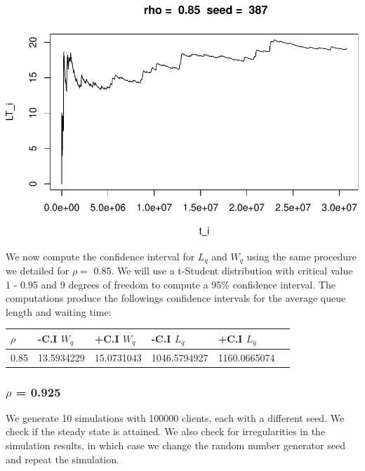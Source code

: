 \documentclass[]{article}
\begin{document}
\includegraphics{003_files/figure-latex/unnamed-chunk-20-10.pdf}

We now compute the confidence interval for \(L_{q}\) and \(W_{q}\) using
the same procedure we detailed for \(\rho =\) 0.85. We will use a
t-Student distribution with critical value 1 - 0.95 and 9 degrees of
freedom to compute a 95\% confidence interval. The computations produce
the followings confidence intervals for the average queue length and
waiting time:

\begin{longtable}[]{@{}llllll@{}}
\toprule
\(\rho\) & -C.I \(W_{q}\) & +C.I \(W_{q}\) & -C.I \(L_{q}\) & +C.I
\(L_{q}\) &\tabularnewline
\midrule
\endhead
0.85 & 13.5934229 & 15.0731043 & 1046.5794927 &
1160.0665074\tabularnewline
\bottomrule
\end{longtable}

\subsubsection{\texorpdfstring{\(\rho\) =
0.925}{\textbackslash{}rho = 0.925}}\label{rho-0.925}

We generate 10 simulations with 100000 clients, each with a different
seed. We check if the steady state is attained. We also check for
irregularities in the simulation results, in which case we change the
random number generator seed and repeat the simulation.
\end{document}
